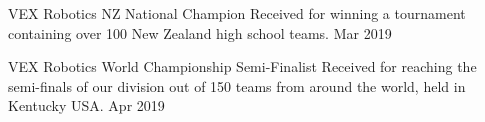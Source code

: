 
\begin{cvhonors}
	\cvhonor
	{VEX Robotics NZ National Champion}
	{Received for winning a tournament containing over 100 New Zealand high school teams.}
	{}
	{Mar 2019}


	\cvhonor
	{VEX Robotics World Championship Semi-Finalist}
	{Received for reaching the semi-finals of our division out of 150 teams from around the world, held in Kentucky USA.}
	{}
	{Apr 2019}
\end{cvhonors}
